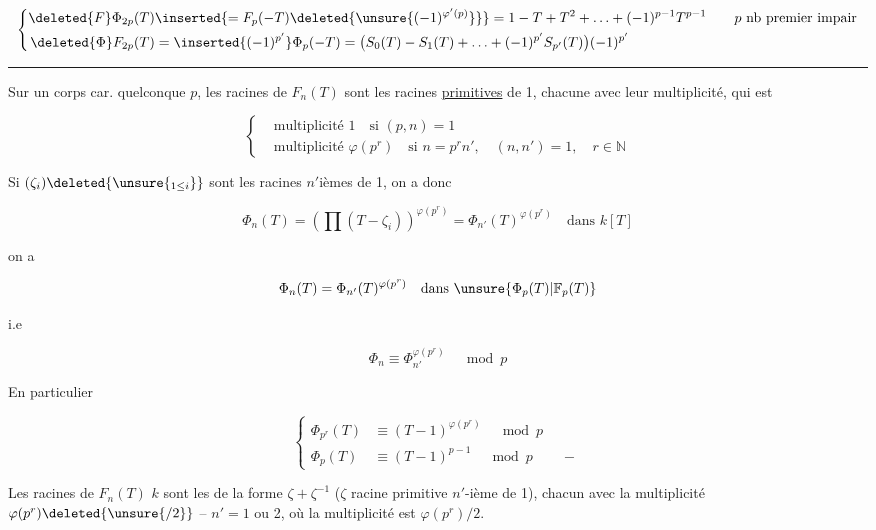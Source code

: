 
\[
\left\{\begin{aligned}
\deleted{F}\Phi_{2p}(T)&\inserted{=F_p(-T)\deleted{\unsure{(-1)^{\varphi'(p)}}}}
=1-T+T^2+\ldots+(-1)^{p-1}T^{p-1}\qquad\text{$p$ nb premier impair}\\
\deleted{\Phi}F_{2p}(T)&=\inserted{(-1)^{p'}}\Phi_p(-T)
=\bigl(S_0(T)-S_1(T)+\ldots+(-1)^{p'}S_{p'}(T)\bigr)(-1)^{p'}
\end{aligned}\right.
\]

\begin{center}\rule{1cm}{.4pt}\end{center}

Sur un corps  car. quelconque $p$, les racines de $F_n(T)$ sont les racines \uline{primitives}   de 1, chacune avec leur multiplicité, qui est

\[
\left\{\begin{aligned}
&\text{multiplicité }1\quad\text{si }(p,n)=1\\
&\text{multiplicité }\varphi(p^r)\quad\text{si }n=p^rn',\quad(n,n')=1,\quad r\in\mathbb N
\end{aligned}\right.
\]

Si $(\zeta_i)\deleted{\unsure{_{1\leq i}}}$ sont les racines   $n'$ièmes de 1, on a donc

\[
\Phi_n(T)=\left(\prod(T-\zeta_i)\right)^{\varphi(p^r)}=\Phi_{n'}(T)^{\varphi(p^r)}\quad\text{dans }k[T]
\]

 on a

\[
\Phi_n(T)=\Phi_{n'}(T)^{\varphi(p^r)}\quad\text{dans }\unsure{\Phi_p(T)|\mathbb F_p(T)}
\]

i.e

\[
\Phi_n\equiv\Phi_{n'}^{\varphi(p^r)}\quad\bmod p
\]

En particulier

\[
\left\{\begin{aligned}
\Phi_{p^r}(T)&\equiv(T-1)^{\varphi(p^r)}\quad\bmod p\\
\Phi_p(T)&\equiv(T-1)^{p-1}\quad\bmod p\qquad -
\end{aligned}\right.
\]

 Les racines de $F_n(T)$  $k$ sont les  de la forme $\zeta+\zeta^{-1}$ ($\zeta$ racine primitive $n'$-ième de 1), chacun avec la multiplicité $\varphi(p^r)\deleted{\unsure{/2}}$ --   $n'=1$ ou 2, où la multiplicité est $\varphi(p^r)/2$.

